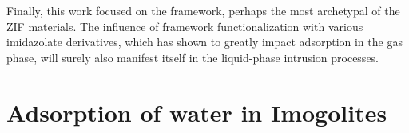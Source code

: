 \documentclass[thesis]{subfiles}
\begin{document}
Finally, this work focused on the  framework, perhaps the most archetypal
of the ZIF materials. The influence of framework functionalization with various
imidazolate derivatives, which has shown to greatly impact adsorption in the gas
phase, will surely also manifest itself in the liquid-phase intrusion processes.

\newpage
\section{Adsorption of water in Imogolites}

\OnlyInSubfile{\printbibliography}
\end{document}
